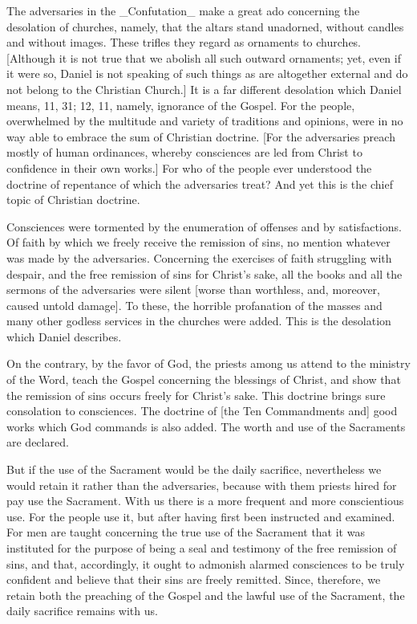 The adversaries in the _Confutation_ make a great ado concerning the
desolation of churches, namely, that the altars stand unadorned,
without candles and without images.  These trifles they regard as
ornaments to churches.  [Although it is not true that we abolish all
such outward ornaments; yet, even if it were so, Daniel is not
speaking of such things as are altogether external and do not belong
to the Christian Church.] It is a far different desolation which
Daniel means, 11, 31; 12, 11, namely, ignorance of the Gospel.  For
the people, overwhelmed by the multitude and variety of traditions
and opinions, were in no way able to embrace the sum of Christian
doctrine.  [For the adversaries preach mostly of human ordinances,
whereby consciences are led from Christ to confidence in their own
works.] For who of the people ever understood the doctrine of
repentance of which the adversaries treat?  And yet this is the chief
topic of Christian doctrine.

Consciences were tormented by the enumeration of offenses and by
satisfactions.  Of faith by which we freely receive the remission of
sins, no mention whatever was made by the adversaries.  Concerning
the exercises of faith struggling with despair, and the free
remission of sins for Christ's sake, all the books and all the
sermons of the adversaries were silent [worse than worthless, and,
moreover, caused untold damage].  To these, the horrible profanation
of the masses and many other godless services in the churches were
added.  This is the desolation which Daniel describes.

On the contrary, by the favor of God, the priests among us attend to
the ministry of the Word, teach the Gospel concerning the blessings
of Christ, and show that the remission of sins occurs freely for
Christ's sake.  This doctrine brings sure consolation to consciences.
The doctrine of [the Ten Commandments and] good works which God
commands is also added.  The worth and use of the Sacraments are
declared.

But if the use of the Sacrament would be the daily sacrifice,
nevertheless we would retain it rather than the adversaries, because
with them priests hired for pay use the Sacrament.  With us there is
a more frequent and more conscientious use.  For the people use it,
but after having first been instructed and examined.  For men are
taught concerning the true use of the Sacrament that it was
instituted for the purpose of being a seal and testimony of the free
remission of sins, and that, accordingly, it ought to admonish
alarmed consciences to be truly confident and believe that their sins
are freely remitted.  Since, therefore, we retain both the preaching
of the Gospel and the lawful use of the Sacrament, the daily
sacrifice remains with us.

